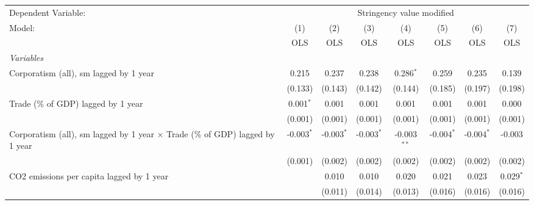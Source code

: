 
\begingroup
\centering
\begin{tabular}{lccccccc}
   \toprule
   Dependent Variable: & \multicolumn{7}{c}{Stringency value modified}\\
   Model:                                                                               & (1)          & (2)          & (3)          & (4)           & (5)          & (6)          & (7)\\  
                                                                                        &  OLS         & OLS          & OLS          & OLS           & OLS          & OLS          & OLS\\  
   \midrule
   \emph{Variables}\\
   Corporatism (all), sm lagged by 1 year                                               & 0.215        & 0.237        & 0.238        & 0.286$^{*}$   & 0.259        & 0.235        & 0.139\\   
                                                                                        & (0.133)      & (0.143)      & (0.142)      & (0.144)       & (0.185)      & (0.197)      & (0.198)\\   
   Trade (\% of GDP) lagged by 1 year                                                   & 0.001$^{*}$  & 0.001        & 0.001        & 0.001         & 0.001        & 0.001        & 0.000\\   
                                                                                        & (0.001)      & (0.001)      & (0.001)      & (0.001)       & (0.001)      & (0.001)      & (0.001)\\   
   Corporatism (all), sm lagged by 1 year $\times$ Trade (\% of GDP) lagged by 1 year   & -0.003$^{*}$ & -0.003$^{*}$ & -0.003$^{*}$ & -0.003$^{**}$ & -0.004$^{*}$ & -0.004$^{*}$ & -0.003\\   
                                                                                        & (0.001)      & (0.002)      & (0.002)      & (0.002)       & (0.002)      & (0.002)      & (0.002)\\   
   CO2 emissions per capita lagged by 1 year                                            &              & 0.010        & 0.010        & 0.020         & 0.021        & 0.023        & 0.029$^{*}$\\   
                                                                                        &              & (0.011)      & (0.014)      & (0.013)       & (0.016)      & (0.016)      & (0.016)\\   

\end{tabular}
